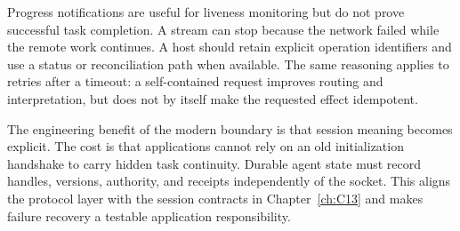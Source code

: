 Progress notifications are useful for liveness monitoring but do not prove successful task completion. A stream can stop because the network failed while the remote work continues. A host should retain explicit operation identifiers and use a status or reconciliation path when available. The same reasoning applies to retries after a timeout: a self-contained request improves routing and interpretation, but does not by itself make the requested effect idempotent.

The engineering benefit of the modern boundary is that session meaning becomes explicit. The cost is that applications cannot rely on an old initialization handshake to carry hidden task continuity. Durable agent state must record handles, versions, authority, and receipts independently of the socket. This aligns the protocol layer with the session contracts in Chapter~\ref{ch:C13} and makes failure recovery a testable application responsibility.

